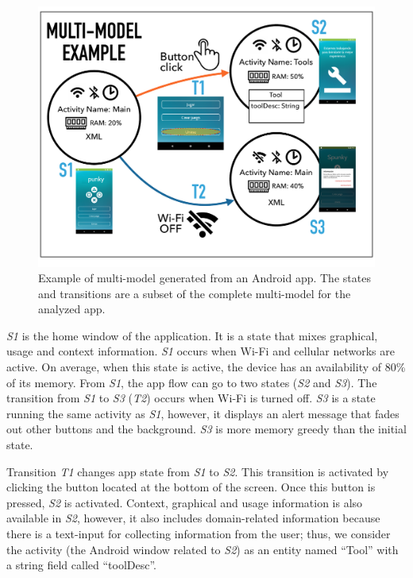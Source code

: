 \begin{figure}[t]
	\centering
	\includegraphics[width=1\textwidth]{img/multimodel.pdf}
	\vspace{-0.8cm}
	\caption{Example of multi-model generated from an Android app. The states and transitions are a subset of the complete multi-model for the analyzed app.}
	
	\label{multimodel}
\end{figure} 


\textit{S1} is the home window of the application. It is a state that mixes graphical, usage and context information. \textit{S1} occurs when Wi-Fi and cellular networks are active. On average, when this state is  active, the device has an availability of 80\% of its memory. %
From \textit{S1}, the app flow can go to two states (\textit{S2} and \textit{S3}). The transition from \textit{S1} to \textit{S3} (\textit{T2}) occurs when Wi-Fi is turned off. \textit{S3} is a state running the same activity as \textit{S1}, however, it displays an alert message that fades out other buttons and the background. \textit{S3} is more memory greedy than the initial state.

Transition \textit{T1} changes app state from \textit{S1} to \textit{S2}. This transition is activated by clicking the button located at the bottom of the screen. Once this button is pressed, \textit{S2} is activated.  Context, graphical and usage information is also available in \textit{S2}, however, it also includes domain-related information because there is a text-input for collecting information from the user; thus, we consider the activity (\ie the Android window related to \textit{S2}) as an entity named ``Tool” with a string field called ``toolDesc”.

